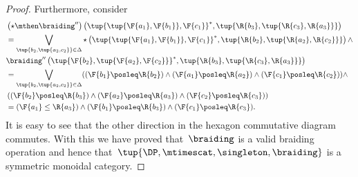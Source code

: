 \begin{proof}
    Furthermore, consider
    \begin{equation}
        \begin{aligned}
            &\left( \star \mthen \braiding''\right)\left( \tup{\tup{\F{a_1},\F{b_1}},\F{c_1}}^*,\tup{\R{b_3},\tup{\R{c_3},\R{a_3}}}\right)\\
            &=\bigvee_{\tup{b_2,\tup{a_2,c_2}}\in \Delta} \star \left(\tup{\tup{\F{a_1},\F{b_1}},\F{c_1}}^*, \tup{\R{b_2},\tup{\R{a_2},\R{c_2}}} \right)\wedge\\
            &\braiding'' \left(\tup{\F{b_2},\tup{\F{a_2},\F{c_2}}}^*,\tup{\R{b_3},\tup{\R{c_3},\R{a_3}}} \right)\\
            &=\bigvee_{\tup{b_2,\tup{a_2,c_2}}\in \Delta}(\left(\F{b_1}\posleq \R{b_2} \right)\wedge \left(\F{a_1}\posleq \R{a_2} \right)\wedge \left( \F{c_1}\posleq \R{c_2}\right)) \wedge\\
            & \left(\left(\F{b_2}\posleq \R{b_3}\right)\wedge \left(\F{a_2}\posleq \R{a_3}\right) \wedge \left(\F{c_2}\posleq \R{c_3}\right)\right)\\
            &=(\F{a_1}\leq \R{a_3}) \wedge (\F{b_1}\posleq \R{b_3}) \wedge (\F{c_1}\posleq \R{c_3}).
        \end{aligned}
    \end{equation}
    It is easy to see that the other direction in the hexagon commutative diagram commutes.
    With this we have proved that~$\braiding$ is a valid braiding operation and hence that~$\tup{\DP, \mtimescat, \singleton, \braiding}$ is a symmetric monoidal category.
\end{proof}
